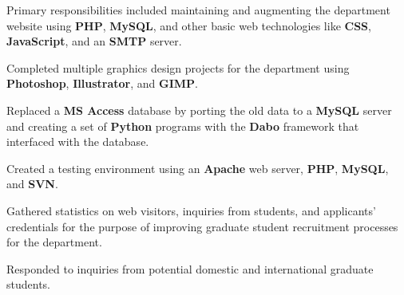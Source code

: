 


\begin{rExperience}

  \item Primary responsibilities included maintaining and augmenting the department website using \textbf{PHP}, \textbf{MySQL}, and other basic web technologies like \textbf{CSS}, \textbf{JavaScript}, and an \textbf{SMTP} server.

  \item Completed multiple graphics design projects for the department using \textbf{Photoshop}, \textbf{Illustrator}, and \textbf{GIMP}.

  \begin{CVonly}

  \item Replaced a \textbf{MS Access} database by porting the old data to a \textbf{MySQL} server and creating a set of \textbf{Python} programs with the \textbf{Dabo} framework that interfaced with the database.


  \item Created a testing environment using an \textbf{Apache} web server, \textbf{PHP}, \textbf{MySQL}, and \textbf{SVN}.

  \item Gathered statistics on web visitors, inquiries from students, and applicants' credentials for the purpose of improving graduate student recruitment processes for the department.

  \item Responded to inquiries from potential domestic and international graduate students.

  \end{CVonly}

\end{rExperience}
